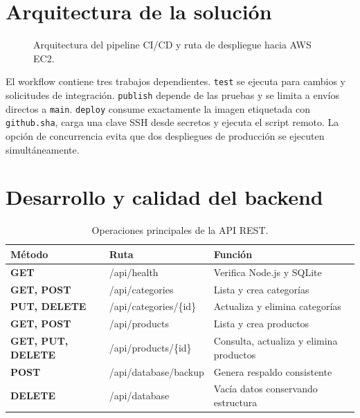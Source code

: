 \documentclass[12pt,letterpaper]{article}
\begin{document}
\section{Arquitectura de la solución}
\begin{figure}[H]
\centering
{}
\caption{Arquitectura del pipeline CI/CD y ruta de despliegue hacia AWS EC2.}
\label{fig:arquitectura}
\end{figure}

El workflow contiene tres trabajos dependientes. \texttt{test} se ejecuta para cambios y solicitudes de integración. \texttt{publish} depende de las pruebas y se limita a envíos directos a \texttt{main}. \texttt{deploy} consume exactamente la imagen etiquetada con \texttt{github.sha}, carga una clave SSH desde secretos y ejecuta el script remoto. La opción de concurrencia evita que dos despliegues de producción se ejecuten simultáneamente.

\section{Desarrollo y calidad del backend}
\begin{table}[H]
\centering
\caption{Operaciones principales de la API REST.}
\begin{tabular}{>{\bfseries}p{1.6cm}p{5.4cm}p{7cm}}
\toprule Método & Ruta & Función \\ \midrule
GET & /api/health & Verifica Node.js y SQLite \\
GET, POST & /api/categories & Lista y crea categorías \\
PUT, DELETE & /api/categories/\{id\} & Actualiza y elimina categorías \\
GET, POST & /api/products & Lista y crea productos \\
GET, PUT, DELETE & /api/products/\{id\} & Consulta, actualiza y elimina productos \\
POST & /api/database/backup & Genera respaldo consistente \\
DELETE & /api/database & Vacía datos conservando estructura \\ \bottomrule
\end{tabular}
\end{table}
\end{document}
